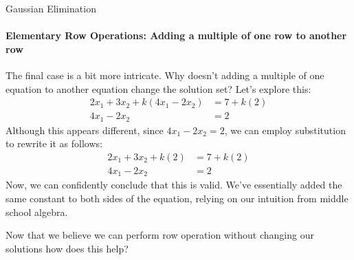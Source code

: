 \documentclass{beamer}
\begin{document}
\begin{frame}{Gaussian Elimination}
\framesubtitle{Elementary Row Operations: Adding a multiple of one row to another row}
The final case is a bit more intricate. Why doesn't adding a multiple of one equation to another equation change the solution set? Let's explore this:
\begin{align*}
    2x_1 + 3x_2 + k(4x_1 - 2x_2) &= 7 + k(2) \\
    4x_1 - 2x_2 &= 2
\end{align*}
Although this appears different, since $4x_1 - 2x_2 = 2$, we can employ substitution to rewrite it as follows:
\begin{align*}
    2x_1 + 3x_2 + k(2) &= 7 + k(2) \\
    4x_1 - 2x_2 &= 2
\end{align*}
Now, we can confidently conclude that this is valid. We've essentially added the same constant to both sides of the equation, relying on our intuition from middle school algebra.

Now that we believe we can perform row operation without changing our solutions how does this help?
\end{frame}
\end{document}
